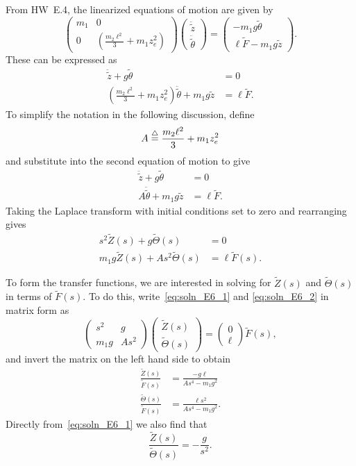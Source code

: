 
From HW~E.4, the linearized equations of motion are given by
\[
\begin{pmatrix}
m_1 & 0 \\ 0 & \left( \frac{m_2 \ell^2}{3} + m_1 z_e^2 \right)
\end{pmatrix} \begin{pmatrix}\ddot{\tilde{z}} \\ \ddot{\tilde{\theta}} \end{pmatrix}
= \begin{pmatrix} -m_1 g \tilde{\theta} \\ \ell \tilde{F} - m_1 g \tilde{z} \end{pmatrix}.
\]
%
These can be expressed as
\begin{align*}
	\ddot{\tilde{z}} + g\tilde{\theta} &= 0 \\
	\left( \frac{m_2 \ell^2}{3} + m_1 z_e^2 \right) \ddot{\tilde{\theta}}  + m_1 g\tilde{z} &= \ell \tilde{F}.
\end{align*}
%
To simplify the notation in the following discussion, define
\[
A \stackrel{\triangle}{=} \frac{m_2 \ell^2}{3} + m_1 z_e^2
\]
and substitute into the second equation of motion to give
\begin{align*}
	\ddot{\tilde{z}} + g\tilde{\theta} &= 0 \\
	A \ddot{\tilde{\theta}}  + m_1 g\tilde{z} &= \ell \tilde{F}.
\end{align*}
%
Taking the Laplace transform with initial conditions set to zero and rearranging gives
\begin{align}
	s^2 \tilde{Z}(s) + g \tilde{\Theta}(s) &=0 \label{eq:soln_E6_1}\\
	m_1 g \tilde{Z}(s) + A s^2\tilde{\Theta}(s) &= \ell\tilde{F}(s) .
\label{eq:soln_E6_2}
\end{align}

To form the transfer functions, we are interested in solving for $\tilde{Z}(s)$ and $\tilde{\Theta}(s)$ in terms of $\tilde{F}(s)$. To do this, write~\eqref{eq:soln_E6_1} and \eqref{eq:soln_E6_2} in matrix form as
\[
\left(\begin{array}{c|c}
s^2 & g \\\hline m_1g & As^2 \end{array}\right)
\begin{pmatrix}\tilde{Z}(s) \\ \tilde{\Theta}(s) \end{pmatrix} 
= \begin{pmatrix} 0 \\ \ell \end{pmatrix} \tilde{F}(s),
\]
and invert the matrix on the left hand side to obtain
\begin{align*}
     \frac{\tilde{Z}(s)}{\tilde{F}(s)} &= \frac{-g\ell}{As^4-m_1g^2} \\
     \frac{\tilde{\Theta}(s)}{\tilde{F}(s)} &= \frac{\ell s^2}{As^4-m_1g^2} .
\end{align*}
%
Directly from~\eqref{eq:soln_E6_1} we also find that 
\[
     \frac{\tilde{Z}(s)}{\tilde{\Theta}(s)} = -\frac{g}{s^2}. 
\]

